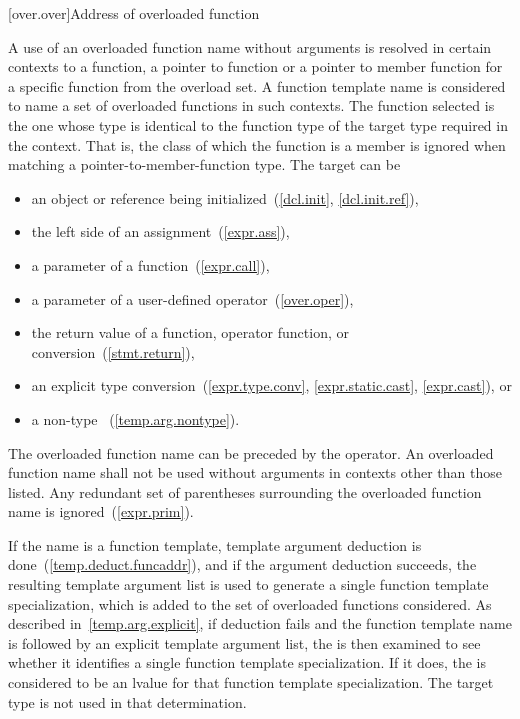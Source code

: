 %

[over.over]{Address of overloaded function}%
%

\pnum
A use of an overloaded function name without arguments is resolved
in certain contexts to a function, a pointer to function or a pointer to
member function for a specific function from the overload set.
A function template name is considered to name a set of overloaded functions
in such contexts.
The function selected is the one whose type is identical to the
function type of the
target type required in the context.
\enternote
That is, the class of which the function is a member is ignored when matching a
pointer-to-member-function type.
\exitnote
The target can be

\begin{itemize}
\item
an object or reference being initialized~(\ref{dcl.init}, \ref{dcl.init.ref}),
\item
the left side of an assignment~(\ref{expr.ass}),
\item
a parameter of a function~(\ref{expr.call}),
\item
a parameter of a user-defined operator~(\ref{over.oper}),
\item
the return value of a function, operator function, or conversion~(\ref{stmt.return}),
\item
an explicit type conversion~(\ref{expr.type.conv}, \ref{expr.static.cast},
\ref{expr.cast}), or
\item
a non-type
~(\ref{temp.arg.nontype}).
\end{itemize}

The overloaded function name can be preceded by the
\tcode{\&}
operator.
An overloaded function name shall not be used without arguments in contexts
other than those listed.
\enternote
Any redundant set of parentheses surrounding the overloaded function name is
ignored~(\ref{expr.prim}).
\exitnote

\pnum
If the name is a function template, template argument deduction is
done~(\ref{temp.deduct.funcaddr}), and if the argument deduction succeeds,
the
resulting template argument list is
used to generate a single
function template specialization,
which is added to the set of overloaded functions
considered.
\enternote
As described in~\ref{temp.arg.explicit}, if deduction fails and the
function template name is followed by an explicit template argument list,
the
is then examined to see whether it identifies a single function template
specialization. If it does, the
is considered to be an lvalue for that function template specialization.
The target type is not used in that determination.
\exitnote

